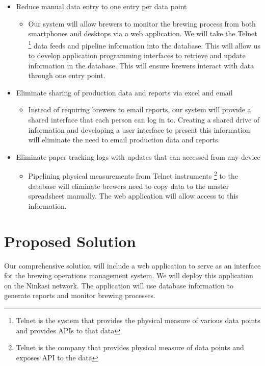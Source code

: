 \documentclass[draftclsnofoot,onecolumn,letterpaper,10pt]{IEEEtran}
\begin{document}
\begin{itemize}

	\item {Reduce manual data entry to one entry per data point}
		\begin{itemize}
			\item {Our system will allow brewers to monitor the brewing process from both smartphones and desktops via a web application. We will take the Telnet \footnote{Telnet is the system that provides the physical measure of various data points and provides APIs to that data} data feeds and pipeline information into the database. This will allow us to develop application programming interfaces to retrieve and update information in the database. This will ensure brewers interact with data through one entry point.}
		\end{itemize}


	\item {Eliminate sharing of production data and reports via excel and email}
	    \begin{itemize}
			\item {Instead of requiring brewers to email reports, our system will provide a shared interface that each person can log in to. Creating a shared drive of information and developing a user interface to present this information will eliminate the need to email production data and reports.}
			\end{itemize}


	\item {Eliminate paper tracking logs with updates that can accessed from any device}
	    \begin{itemize}
			\item {Pipelining physical measurements from Telnet instruments \footnote{Telnet is the company that provides physical measure of data points and exposes API to the data} to the database will eliminate brewers need to copy data to the master spreadsheet manually. The web application will allow access to this information.}
		\end{itemize}
\end{itemize}

\section{\textbf{Proposed Solution}}
Our comprehensive solution will include a web application to serve as an interface for the brewing operations management system. We will deploy this application on the Ninkasi network. The application will use database information to generate reports and monitor brewing processes.
\end{document}
